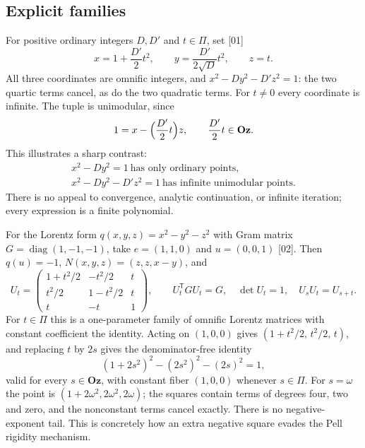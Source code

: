 \documentclass[11pt,oneside]{article}
\numberwithin{equation}{section}
\theoremstyle{definition}
\theoremstyle{remark}
\newcommand{\Oz}{\mathbf{Oz}}
\newcommand{\diag}{\operatorname{diag}}
\newcommand{\src}[1]{\textup{\textsf{\small[#1]}}}
\begin{document}
\subsection{Explicit families}

For positive ordinary integers $D,D'$ and $t\in\Pi$, set \src{01}
\begin{equation}\label{odg:eq:hyperboloid}
 x=1+\frac{D'}2t^2,\qquad
 y=\frac{D'}{2\sqrt D}t^2,\qquad z=t.
\end{equation}
All three coordinates are omnific integers, and $x^2-Dy^2-D'z^2=1$: the two
quartic terms cancel, as do the two quadratic terms. For $t\ne0$ every
coordinate is infinite. The tuple is unimodular, since
\begin{equation}\label{odg:eq:hyperunimodular}
 1=x-\Bigl(\frac{D'}2t\Bigr)z,
 \qquad \frac{D'}2t\in\Oz .
\end{equation}
This illustrates a sharp contrast:
\begin{gather*}
 x^2-Dy^2=1\ \text{has only ordinary points},\\
 x^2-Dy^2-D'z^2=1\ \text{has infinite unimodular points}.
\end{gather*}
There is no appeal to convergence, analytic continuation, or infinite
iteration; every expression is a finite polynomial.

For the Lorentz form $q(x,y,z)=x^2-y^2-z^2$ with Gram matrix
$G=\diag(1,-1,-1)$, take $e=(1,1,0)$ and $u=(0,0,1)$ \src{02}. Then
$q(u)=-1$, $N(x,y,z)=(z,z,x-y)$, and
\begin{equation}\label{odg:eq:lorentzmatrix}
 U_t=
 \begin{pmatrix}
 1+t^2/2&-t^2/2&t\\
 t^2/2&1-t^2/2&t\\
 t&-t&1
 \end{pmatrix},
 \qquad
 U_t^{\mathsf T}GU_t=G,\quad \det U_t=1,\quad U_sU_t=U_{s+t}.
\end{equation}
For $t\in\Pi$ this is a one-parameter family of omnific Lorentz matrices with
constant coefficient the identity. Acting on $(1,0,0)$ gives
$(1+t^2/2,\,t^2/2,\,t)$, and replacing $t$ by $2s$ gives the
denominator-free identity
\[
 (1+2s^2)^2-(2s^2)^2-(2s)^2=1,
\]
valid for every $s\in\Oz$, with constant fiber $(1,0,0)$ whenever
$s\in\Pi$. For $s=\omega$ the point is $(1+2\omega^2,2\omega^2,2\omega)$; the
squares contain terms of degrees four, two and zero, and the nonconstant
terms cancel exactly. There is no negative-exponent tail. This is concretely
how an extra negative square evades the Pell rigidity mechanism.
\end{document}
